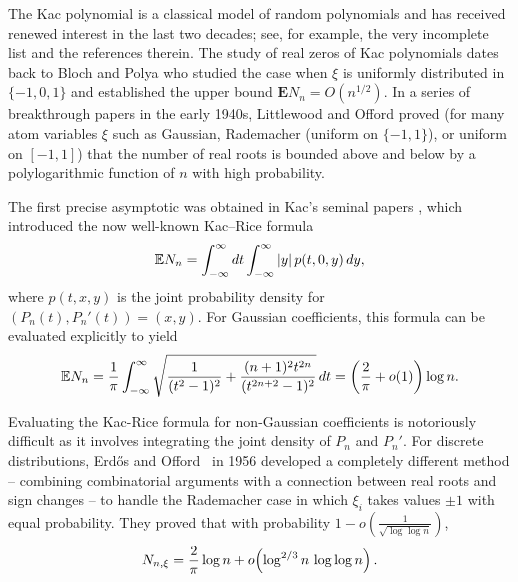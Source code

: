 \documentclass[12pt, reqno]{amsart}
\theoremstyle{plain}
\theoremstyle{definition}
\newcommand\E{{\mathbb{E}}}
\begin{document}
The Kac polynomial is a classical model of random polynomials and has received renewed interest in the last two decades; see, for example, the very incomplete list \cite{BharuchaSambandham, Farahmand1996, SheppVanderbei1995, ibragimov1997roots, shiffman2003equilibrium, TaoVu2010, kabluchko2013roots, ORourke2019pairing, michelen2021real, OanhNguyenVu2022, nguyen2024hole, michelen2024central, michelen2025limit} and the references therein. The study of real zeros of Kac polynomials dates back to Bloch and Polya \cite{BP} who studied the case when $\xi$ is uniformly distributed in $\{-1,0,1\}$ and established the upper bound
$\mathbf{E} N_n = O(n^{1/2}).$
In a series of breakthrough papers \cite{LO1,LO2,LO3}
in the early 1940s, Littlewood and Offord proved (for many atom variables
$\xi$ such as Gaussian, Rademacher (uniform on $\{-1, 1\}$), or uniform on $[-1,1]$) that the number of real roots is bounded above and below by a polylogarithmic function of $n$ with high probability.

The first precise asymptotic was obtained in Kac’s seminal papers \cite{Kac1943average}, which introduced the now well-known Kac–Rice formula
\begin{equation}  
	\E N_n = \int_{-\infty}^{\infty} dt \int_{-\infty}^{\infty} |y| \, p(t,0,y) \, dy,\notag
\end{equation}
where $p(t,x,y)$ is the joint probability density for $(P_n(t), P_n'(t)) = (x, y)$. For Gaussian coefficients, this formula can be evaluated explicitly to yield
\begin{equation}  
	\E N_n = \frac{1}{\pi} \int_{-\infty}^{\infty}
	\sqrt{ \frac{1}{(t^2 - 1)^2} + \frac{(n+1)^2 t^{2n}}{(t^{2n+2} - 1)^2} } \, dt
	= \left( \frac{2}{\pi} + o(1) \right) \log n.\notag
\end{equation} 
 
Evaluating the Kac-Rice formula for non-Gaussian coefficients is notoriously difficult as it involves integrating the joint density of $P_n$ and $P_n'$. For discrete distributions, Erd\H{o}s and Offord~\cite{EO} in 1956 developed a completely different method -- combining combinatorial arguments with a connection between real roots and sign changes -- to handle the Rademacher case in which $\xi_i$ takes values $\pm 1$ with equal probability. They proved that with probability $1 - o\!\left(\frac{1}{\sqrt{\log\log n}}\right)$,
\begin{equation}  
	N_{n,\xi} = \frac{2}{\pi} \log n + o\!\left( \log^{2/3} n \, \log\log n \right).\notag
\end{equation}
\end{document}

